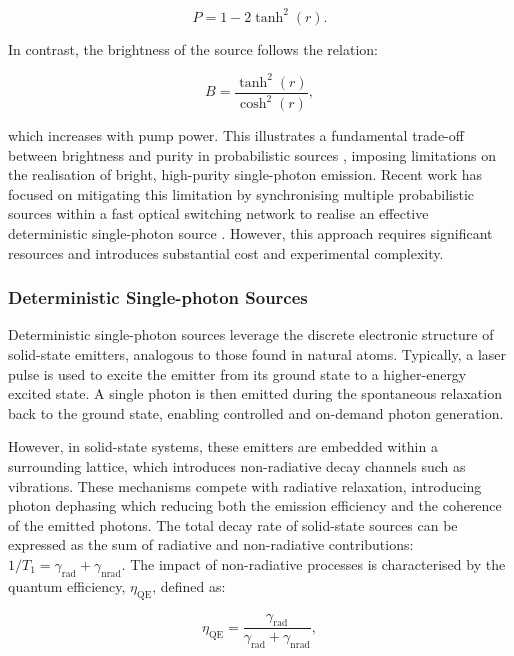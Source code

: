 \begin{equation}
    P = 1 - 2\tanh^2(r).
\end{equation}

In contrast, the brightness of the source follows the relation:

\begin{equation}
    B = \frac{\tanh^2(r)}{\cosh^2(r)},
\end{equation}

which increases with pump power. This illustrates a fundamental trade-off between brightness and purity in probabilistic sources \cite{Senellart2017}, imposing limitations on the realisation of bright, high-purity single-photon emission. Recent work has focused on mitigating this limitation by synchronising multiple probabilistic sources within a fast optical switching network to realise an effective deterministic single-photon source \cite{Meyer-Scott2020}. However, this approach requires significant resources and introduces substantial cost and experimental complexity.


\subsubsection{Deterministic Single-photon Sources}

Deterministic single-photon sources leverage the discrete electronic structure of solid-state emitters, analogous to those found in natural atoms. Typically, a laser pulse is used to excite the emitter from its ground state to a higher-energy excited state. A single photon is then emitted during the spontaneous relaxation back to the ground state, enabling controlled and on-demand photon generation.

However, in solid-state systems, these emitters are embedded within a surrounding lattice, which introduces non-radiative decay channels such as vibrations. These mechanisms compete with radiative relaxation, introducing photon dephasing which reducing both the emission efficiency and the coherence of the emitted photons. The total decay rate of solid-state sources can be expressed as the sum of radiative and non-radiative contributions: $1/T_1 = \gamma_{\mathrm{rad}} + \gamma_{\mathrm{nrad}}$. The impact of non-radiative processes is characterised by the quantum efficiency, $\eta_{\mathrm{QE}}$, defined as:

\begin{equation}
    \eta_{\mathrm{QE}} = \frac{\gamma_{\mathrm{rad}}}{\gamma_{\mathrm{rad}} + \gamma_{\mathrm{nrad}}},
\end{equation}

